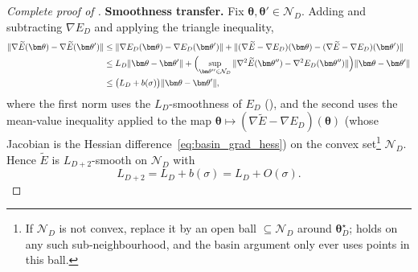 \documentclass[11pt]{article}
\newcommand{\cN}{\mathcal{N}}
\theoremstyle{plain}
\theoremstyle{plain}
\begin{document}
\begin{proof}[Complete proof of ]
\textbf{Smoothness transfer.}  Fix $\bm\theta,\bm\theta'\in\cN_D$.
Adding and subtracting $\nabla E_D$ and applying the triangle
inequality,
\begin{align}
  \|\nabla\widetilde{E}(\bm\theta)
  -\nabla\widetilde{E}(\bm\theta')\|
  &\le\|\nabla E_D(\bm\theta)-\nabla E_D(\bm\theta')\|
  +\|(\nabla\widetilde{E}-\nabla E_D)(\bm\theta)
  -(\nabla\widetilde{E}-\nabla E_D)(\bm\theta')\|
  \notag\\
  &\le L_D\|\bm\theta-\bm\theta'\|
  +\Bigl(\sup_{\bm\theta''\in\cN_D}
     \|\nabla^2\widetilde{E}(\bm\theta'')-\nabla^2 E_D(\bm\theta'')\|\Bigr)
     \|\bm\theta-\bm\theta'\|
  \label{eq:basin_smooth_transfer}\\
  &\le\bigl(L_D+b(\sigma)\bigr)\|\bm\theta-\bm\theta'\| ,
  \notag
\end{align}
where the first norm uses the $L_D$-smoothness of $E_D$
(), and the second uses the mean-value inequality
applied to the map $\bm\theta\mapsto(\nabla\widetilde{E}-\nabla E_D)
(\bm\theta)$ (whose Jacobian is the Hessian
difference~\eqref{eq:basin_grad_hess}) on the convex
set\footnote{If $\cN_D$ is not convex, replace it by an open ball
$\subseteq\cN_D$ around $\bm\theta_D^\star$;  holds
on any such sub-neighbourhood, and the basin argument only ever uses
points in this ball.} $\cN_D$.  Hence $\widetilde{E}$ is
$L_{D+2}$-smooth on $\cN_D$ with
\begin{equation}\label{eq:basin_L}
  L_{D+2}=L_D+b(\sigma)=L_D+O(\sigma).
\end{equation}


\end{proof}
\end{document}
